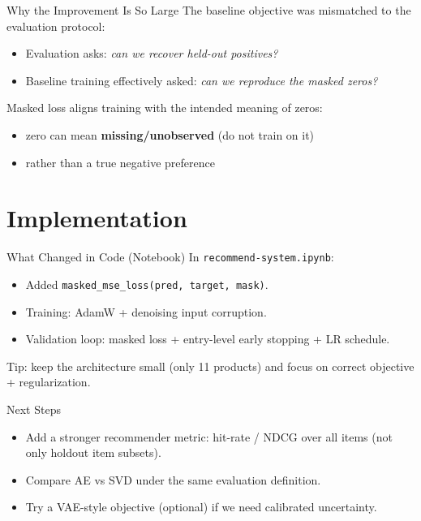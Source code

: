 \documentclass[aspectratio=169]{beamer}
\begin{document}
\begin{frame}{Why the Improvement Is So Large}
	The baseline objective was mismatched to the evaluation protocol:
	\begin{itemize}
		\item Evaluation asks: \emph{can we recover held-out positives?}
		\item Baseline training effectively asked: \emph{can we reproduce the masked zeros?}
	\end{itemize}
	\vspace{0.5em}
	Masked loss aligns training with the intended meaning of zeros:
	\begin{itemize}
		\item zero can mean \textbf{missing/unobserved} (do not train on it)
		\item rather than a true negative preference
	\end{itemize}
\end{frame}

\section{Implementation}

\begin{frame}{What Changed in Code (Notebook)}
	In \texttt{recommend-system.ipynb}:
	\begin{itemize}
		\item Added \texttt{masked\_mse\_loss(pred, target, mask)}.
		\item Training: AdamW + denoising input corruption.
		\item Validation loop: masked loss + entry-level early stopping + LR schedule.
	\end{itemize}
	\vspace{0.5em}
	Tip: keep the architecture small (only 11 products) and focus on correct objective + regularization.
\end{frame}

\begin{frame}{Next Steps}
	\begin{itemize}
		\item Add a stronger recommender metric: hit-rate / NDCG over all items (not only holdout item subsets).
		\item Compare AE vs SVD under the same evaluation definition.
		\item Try a VAE-style objective (optional) if we need calibrated uncertainty.
	\end{itemize}
\end{frame}
\end{document}
